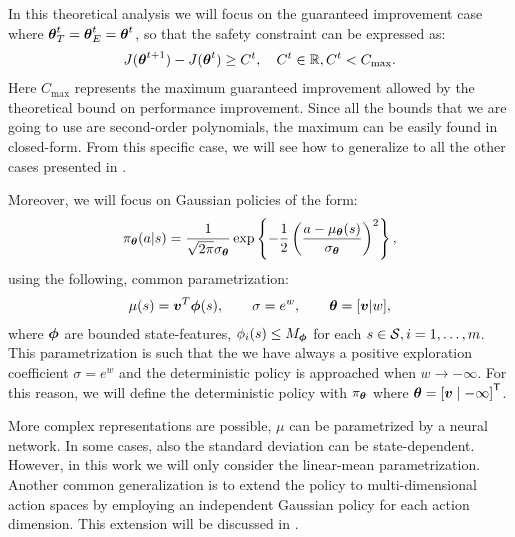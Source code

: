 In this theoretical analysis we will focus on the guaranteed improvement case where ${{\boldsymbol{\theta}}}^{t}_T={\boldsymbol{\theta}}_E^t = {\boldsymbol{\theta}}^t$, so that the safety constraint can be expressed as:
%
\begin{align*}
J({\boldsymbol{\theta}}^{t+1}) - J({\boldsymbol{\theta}}^t) \geq C^t, \quad C^t \in \mathbb{R}, C^t < C_{\text{max}}.
\end{align*}
Here $C_\text{max}$ represents the maximum guaranteed improvement allowed by the theoretical bound on performance improvement. Since all the bounds that we are going to use are second-order polynomials, the maximum can be easily found in closed-form. From this specific case, we will see how to generalize to all the other cases presented in .

Moreover, we will focus on Gaussian policies of the form:
\[
	\pi_{{\boldsymbol{\theta}}}(a\vert s) = \frac{1}{\sqrt{2\pi}\sigma_{{\boldsymbol{\theta}}}}\exp\left\{-\frac{1}{2}\left(\frac{a - \mu_{{\boldsymbol{\theta}}}(s)}{\sigma_{{\boldsymbol{\theta}}}}\right)^2\right\},
\]
using the following, common parametrization:
\begin{align}\label{eq:parametrization}
\mu(s)=\boldsymbol{v}^T\boldsymbol{\phi}(s), \qquad \sigma=e^w, \qquad {\boldsymbol{\theta}}=[\boldsymbol{v}\vert w],
\end{align}
where $\boldsymbol{\phi}$ are bounded state-features, \ie $\phi_i(s) \leq M_{\boldsymbol{\phi}}$ for each $s\in\mathcal{S}, i=1,\dots,m$.
This parametrization is such that the we have always a positive exploration coefficient $\sigma=e^w$ and the deterministic policy is approached when $w \rightarrow -\infty$. For this reason, we will define the deterministic policy with $\pi_{{\boldsymbol{\theta}}}$ where ${\boldsymbol{\theta}} = {[\boldsymbol{v} \mid -\infty]}^{\mathsf{T}}$.


More complex representations are possible, \eg $\mu$ can be parametrized by a neural network. In some cases, also the standard deviation can be state-dependent. However, in this work we will only consider the linear-mean parametrization. \\
Another common generalization is to extend the policy to multi-dimensional action spaces by employing an independent Gaussian policy for each action dimension. This extension will be discussed in .

